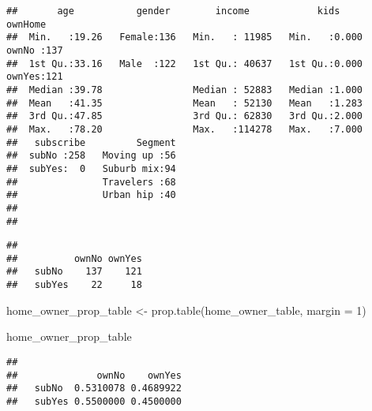 \documentclass[
]{article}
\newenvironment{Shaded}{\begin{snugshade}}{\end{snugshade}}
\newcommand{\AttributeTok}[1]{\textcolor[rgb]{0.77,0.63,0.00}{#1}}
\newcommand{\CommentTok}[1]{\textcolor[rgb]{0.56,0.35,0.01}{\textit{#1}}}
\newcommand{\DecValTok}[1]{\textcolor[rgb]{0.00,0.00,0.81}{#1}}
\newcommand{\FunctionTok}[1]{\textcolor[rgb]{0.00,0.00,0.00}{#1}}
\newcommand{\NormalTok}[1]{#1}
\newcommand{\OtherTok}[1]{\textcolor[rgb]{0.56,0.35,0.01}{#1}}
\newcommand{\SpecialCharTok}[1]{\textcolor[rgb]{0.00,0.00,0.00}{#1}}
\begin{document}
\begin{verbatim}
##       age           gender        income            kids         ownHome   
##  Min.   :19.26   Female:136   Min.   : 11985   Min.   :0.000   ownNo :137  
##  1st Qu.:33.16   Male  :122   1st Qu.: 40637   1st Qu.:0.000   ownYes:121  
##  Median :39.78                Median : 52883   Median :1.000               
##  Mean   :41.35                Mean   : 52130   Mean   :1.283               
##  3rd Qu.:47.85                3rd Qu.: 62830   3rd Qu.:2.000               
##  Max.   :78.20                Max.   :114278   Max.   :7.000               
##   subscribe         Segment  
##  subNo :258   Moving up :56  
##  subYes:  0   Suburb mix:94  
##               Travelers :68  
##               Urban hip :40  
##                              
## 
\end{verbatim}

\begin{Shaded}
\end{Shaded}

\begin{verbatim}
##         
##          ownNo ownYes
##   subNo    137    121
##   subYes    22     18
\end{verbatim}

\begin{Shaded}
\begin{Highlighting}[]
\NormalTok{home\_owner\_prop\_table }\OtherTok{\textless{}{-}} \FunctionTok{prop.table}\NormalTok{(home\_owner\_table, }\AttributeTok{margin =} \DecValTok{1}\NormalTok{)}

\NormalTok{home\_owner\_prop\_table}
\end{Highlighting}
\end{Shaded}

\begin{verbatim}
##         
##              ownNo    ownYes
##   subNo  0.5310078 0.4689922
##   subYes 0.5500000 0.4500000
\end{verbatim}
\end{document}
